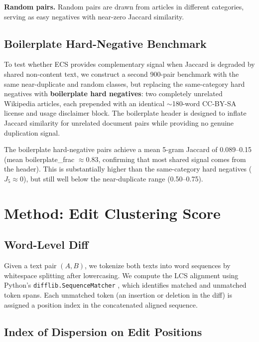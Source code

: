 \documentclass[11pt,letterpaper]{article}
\begin{document}
\noindent\textbf{Random pairs.} Random pairs are drawn from articles in different categories, serving as easy negatives with near-zero Jaccard similarity.

\subsection{Boilerplate Hard-Negative Benchmark}

To test whether ECS provides complementary signal when Jaccard is degraded by shared non-content text, we construct a second 900-pair benchmark with the same near-duplicate and random classes, but replacing the same-category hard negatives with \textbf{boilerplate hard negatives}: two completely unrelated Wikipedia articles, each prepended with an identical $\sim$180-word CC-BY-SA license and usage disclaimer block. The boilerplate header is designed to inflate Jaccard similarity for unrelated document pairs while providing no genuine duplication signal.

The boilerplate hard-negative pairs achieve a mean 5-gram Jaccard of 0.089--0.15 (mean boilerplate\_frac $\approx 0.83$, confirming that most shared signal comes from the header). This is substantially higher than the same-category hard negatives ($J_5 \approx 0$), but still well below the near-duplicate range (0.50--0.75).

\section{Method: Edit Clustering Score}
\label{sec:method}

\subsection{Word-Level Diff}

Given a text pair $(A, B)$, we tokenize both texts into word sequences by whitespace splitting after lowercasing. We compute the LCS alignment using Python's \texttt{difflib.SequenceMatcher} \citep{Peters2001}, which identifies matched and unmatched token spans. Each unmatched token (an insertion or deletion in the diff) is assigned a position index in the concatenated aligned sequence.

\subsection{Index of Dispersion on Edit Positions}
\end{document}
